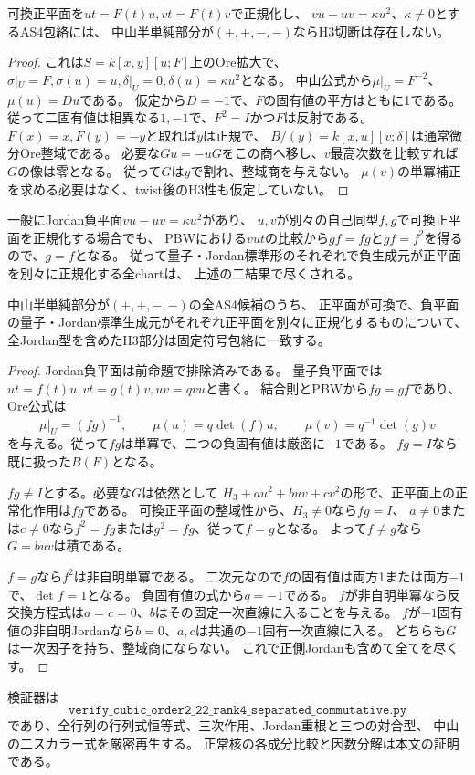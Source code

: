 \begin{proposition}
\label{prop:h3-order2-22-rank4-separated-Jordan}
可換正平面を$ut=F(t)u,vt=F(t)v$で正規化し、
$vu-uv=\kappa u^2$、$\kappa\ne0$とするAS4包絡には、
中山半単純部分が$(+,+,-,-)$ならH3切断は存在しない。
\end{proposition}
\begin{proof}
これは$S=k[x,y][u;F]$上のOre拡大で、
$\sigma|_U=F,\sigma(u)=u,\delta|_U=0,\delta(u)=\kappa u^2$となる。
中山公式から$\mu|_U=F^{-2}$、$\mu(u)=D u$である。
仮定から$D=-1$で、$F$の固有値の平方はともに1である。
従って二固有値は相異なる$1,-1$で、$F^2=I$かつ$F$は反射である。
$F(x)=x,F(y)=-y$と取れば$y$は正規で、
$B/(y)=k[x,u][v;\delta]$は通常微分Ore整域である。
必要な$Gu=-uG$をこの商へ移し、$v$最高次数を比較すれば$G$の像は零となる。
従って$G$は$y$で割れ、整域商を与えない。
$\mu(v)$の単冪補正を求める必要はなく、twist後のH3性も仮定していない。
\end{proof}

一般にJordan負平面$vu-uv=\kappa u^2$があり、
$u,v$が別々の自己同型$f,g$で可換正平面を正規化する場合でも、
PBWにおける$vut$の比較から$gf=fg$と$gf=f^2$を得るので、$g=f$となる。
従って量子・Jordan標準形のそれぞれで負生成元が正平面を別々に正規化する全chartは、
上述の二結果で尽くされる。


\begin{corollary}
\label{cor:h3-order2-22-rank4-separated-all-Jordan}
中山半単純部分が$(+,+,-,-)$の全AS4候補のうち、
正平面が可換で、負平面の量子・Jordan標準生成元がそれぞれ正平面を別々に正規化するものについて、
全Jordan型を含めたH3部分は固定符号包絡に一致する。
\end{corollary}
\begin{proof}
Jordan負平面は前命題で排除済みである。
量子負平面では$ut=f(t)u,vt=g(t)v,uv=qvu$と書く。
結合則とPBWから$fg=gf$であり、Ore公式は
\[
 \mu|_U=(fg)^{-1},\qquad
 \mu(u)=q\det(f)u,\qquad
 \mu(v)=q^{-1}\det(g)v
\]
を与える。従って$fg$は単冪で、二つの負固有値は厳密に$-1$である。
$fg=I$なら既に扱った$B(F)$となる。

$fg\ne I$とする。必要な$G$は依然として
$H_3+a u^2+buv+c v^2$の形で、正平面上の正常化作用は$fg$である。
可換正平面の整域性から、$H_3\ne0$なら$fg=I$、
$a\ne0$または$c\ne0$なら$f^2=fg$または$g^2=fg$、従って$f=g$となる。
よって$f\ne g$なら$G=buv$は積である。

$f=g$なら$f^2$は非自明単冪である。
二次元なので$f$の固有値は両方1または両方$-1$で、$\det f=1$となる。
負固有値の式から$q=-1$である。
$f$が非自明単冪なら反交換方程式は$a=c=0$、$b$はその固定一次直線に入ることを与える。
$f$が$-1$固有値の非自明Jordanなら$b=0$、$a,c$は共通の$-1$固有一次直線に入る。
どちらも$G$は一次因子を持ち、整域商にならない。
これで正側Jordanも含めて全てを尽くす。
\end{proof}


検証器は
\[
 \texttt{verify\_cubic\_order2\_22\_rank4\_separated\_commutative.py}
\]
であり、全行列の行列式恒等式、三次作用、Jordan重根と三つの対合型、
中山の二スカラー式を厳密再生する。
正常核の各成分比較と因数分解は本文の証明である。
